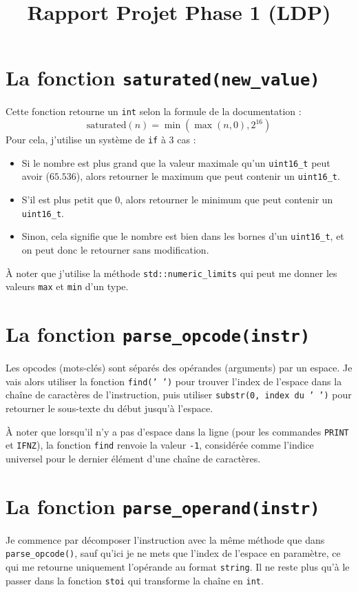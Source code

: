 \documentclass[a4paper,10pt]{article}
\title{Rapport Projet Phase 1 (LDP)}
\author{}
\date{}
\begin{document}
\maketitle

\section{La fonction \texttt{saturated(new\_value)}}
Cette fonction retourne un \texttt{int} selon la formule de la documentation :
\[
\text{saturated}(n) = \min(\max(n, 0), 2^{16})
\]
Pour cela, j'utilise un système de \texttt{if} à 3 cas :
\begin{itemize}
    \item Si le nombre est plus grand que la valeur maximale qu'un \texttt{uint16\_t} peut avoir ($65.536$), alors retourner le maximum que peut contenir un \texttt{uint16\_t}.
    \item S'il est plus petit que $0$, alors retourner le minimum que peut contenir un \texttt{uint16\_t}.
    \item Sinon, cela signifie que le nombre est bien dans les bornes d'un \texttt{uint16\_t}, et on peut donc le retourner sans modification.
\end{itemize}
À noter que j'utilise la méthode \texttt{std::numeric\_limits} qui peut me donner les valeurs \texttt{max} et \texttt{min} d'un type.

\section{La fonction \texttt{parse\_opcode(instr)}}
Les opcodes (mots-clés) sont séparés des opérandes (arguments) par un espace. Je vais alors utiliser la fonction \texttt{find(' ')} pour trouver l'index de l'espace dans la chaîne de caractères de l'instruction, puis utiliser \texttt{substr(0, index du ' ')} pour retourner le sous-texte du début jusqu'à l'espace.

À noter que lorsqu'il n'y a pas d'espace dans la ligne (pour les commandes \texttt{PRINT} et \texttt{IFNZ}), la fonction \texttt{find} renvoie la valeur \texttt{-1}, considérée comme l'indice universel pour le dernier élément d'une chaîne de caractères.

\section{La fonction \texttt{parse\_operand(instr)}}
Je commence par décomposer l'instruction avec la même méthode que dans \texttt{parse\_opcode()}, sauf qu'ici je ne mets que l'index de l'espace en paramètre, ce qui me retourne uniquement l'opérande au format \texttt{string}. Il ne reste plus qu'à le passer dans la fonction \texttt{stoi} qui transforme la chaîne en \texttt{int}.
\end{document}
